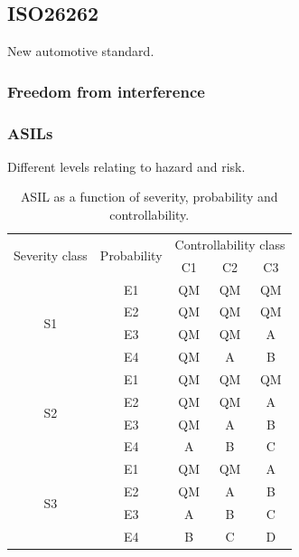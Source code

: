 \subsection{ISO26262}
New automotive standard.

\subsubsection{Freedom from interference}


\subsubsection{ASILs}
Different levels relating to hazard and risk.

\begin{table}[h]
\centering
\begin{tabular}{|c|c|c|c|c|}
\hline
\multirow{2}{*}{Severity class} &\multirow{2}{*}{Probability} &\multicolumn{3}{|c|}{Controllability class} \\ \cline{3-5}
 & &C1 &C2 &C3 \\ \hline
\multirow{4}{*}{S1} & E1 & QM & QM & QM \\ \cline{2-5}
 & E2 & QM & QM & QM \\ \cline{2-5}
 & E3 & QM & QM & A \\ \cline{2-5}
 & E4 & QM & A & B \\ \hline
\multirow{4}{*}{S2} & E1 & QM & QM & QM \\ \cline{2-5}
 & E2 & QM & QM & A \\ \cline{2-5}
 & E3 & QM & A & B \\ \cline{2-5}
 & E4 & A & B & C \\ \hline
\multirow{4}{*}{S3} & E1 & QM & QM & A \\ \cline{2-5}
 & E2 & QM & A & B \\ \cline{2-5}
 & E3 & A & B & C \\ \cline{2-5}
 & E4 & B & C & D \\ \hline
\end{tabular}
\caption{ASIL as a function of severity, probability and controllability.}
\label{table:ASIL}
\end{table}
